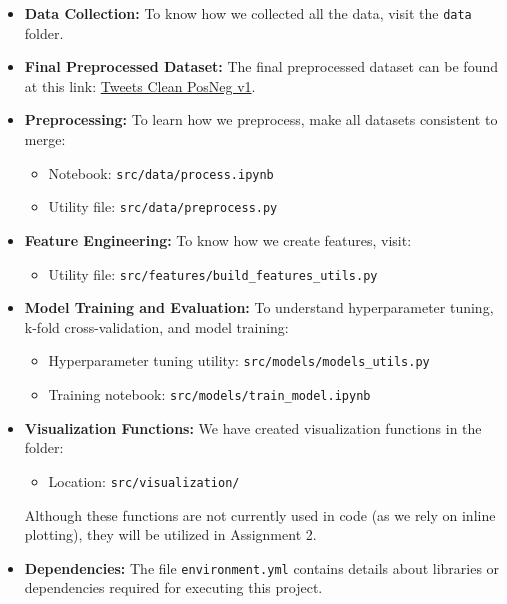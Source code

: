 \begin{itemize}
    \item \textbf{Data Collection:} To know how we collected all the data, visit the \texttt{data} folder.
    \item \textbf{Final Preprocessed Dataset:} The final preprocessed dataset can be found at this link: 
    \href{https://www.kaggle.com/datasets/zphudzz/tweets-clean-posneg-v1}{Tweets Clean PosNeg v1}.
    \item \textbf{Preprocessing:} To learn how we preprocess, make all datasets consistent to merge:
    \begin{itemize}
        \item Notebook: \texttt{src/data/process.ipynb}
        \item Utility file: \texttt{src/data/preprocess.py}
    \end{itemize}
    \item \textbf{Feature Engineering:} To know how we create features, visit:
    \begin{itemize}
        \item Utility file: \texttt{src/features/build\_features\_utils.py}
    \end{itemize}
    \item \textbf{Model Training and Evaluation:} To understand hyperparameter tuning, k-fold cross-validation, and model training:
    \begin{itemize}
        \item Hyperparameter tuning utility: \texttt{src/models/models\_utils.py}
        \item Training notebook: \texttt{src/models/train\_model.ipynb}
    \end{itemize}
    \item \textbf{Visualization Functions:} We have created visualization functions in the folder:
    \begin{itemize}
        \item Location: \texttt{src/visualization/}
    \end{itemize}
    Although these functions are not currently used in code (as we rely on inline plotting), they will be utilized in Assignment 2.
    \item \textbf{Dependencies:} The file \texttt{environment.yml} contains details about libraries or dependencies required for executing this project.
\end{itemize}

\newpage
